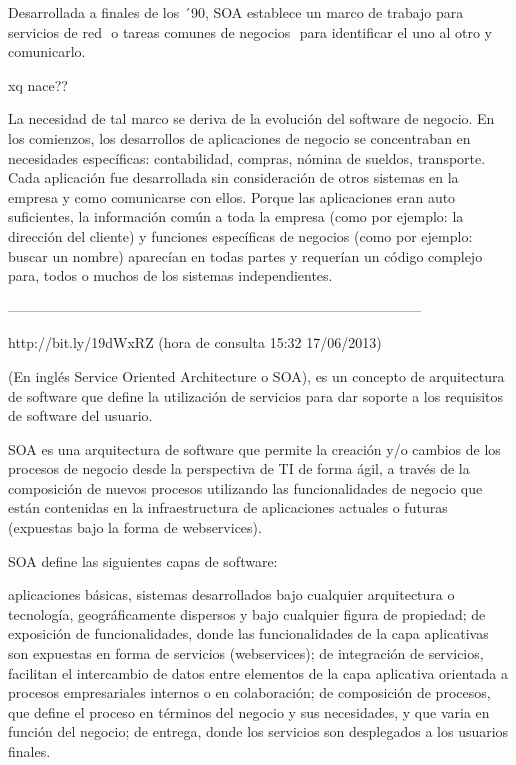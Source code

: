 Desarrollada a finales de los ´90, SOA establece un marco de trabajo para servicios de red  o tareas comunes de negocios  para 
identificar el uno al otro y comunicarlo. 

xq nace??

La necesidad de tal marco se deriva de la evolución del software de negocio. En los comienzos, los desarrollos de aplicaciones 
de negocio se concentraban en necesidades específicas: contabilidad, compras, nómina de sueldos, transporte. Cada aplicación 
fue desarrollada sin consideración de otros sistemas en la empresa y como comunicarse con ellos. Porque las aplicaciones eran 
auto suficientes, la información común a toda la empresa (como por ejemplo: la dirección del cliente) y funciones específicas 
de negocios (como por ejemplo: buscar un nombre) aparecían en todas partes y requerían un código complejo para, todos o muchos 
de los sistemas independientes.

-----------------------------------------------------------------------------------------

http://bit.ly/19dWxRZ (hora de consulta 15:32 17/06/2013)


(En inglés Service Oriented Architecture o SOA), es un concepto de arquitectura de software que define la utilización de 
servicios para dar soporte a los requisitos de software del usuario.

SOA es una arquitectura de software que permite la creación y/o cambios de los procesos de negocio desde la perspectiva 
de TI de forma ágil, a través de la composición de nuevos procesos utilizando las funcionalidades de negocio que están 
contenidas en la infraestructura de aplicaciones actuales o futuras (expuestas bajo la forma de webservices).

SOA define las siguientes capas de software:

    aplicaciones básicas, sistemas desarrollados bajo cualquier arquitectura o tecnología, geográficamente dispersos y bajo 
     cualquier figura de propiedad;
    de exposición de funcionalidades, donde las funcionalidades de la capa aplicativas son expuestas en forma de servicios (webservices);
    de integración de servicios, facilitan el intercambio de datos entre elementos de la capa aplicativa orientada a procesos 
     empresariales internos o en colaboración;
    de composición de procesos, que define el proceso en términos del negocio y sus necesidades, y que varia en función del negocio;
    de entrega, donde los servicios son desplegados a los usuarios finales.

